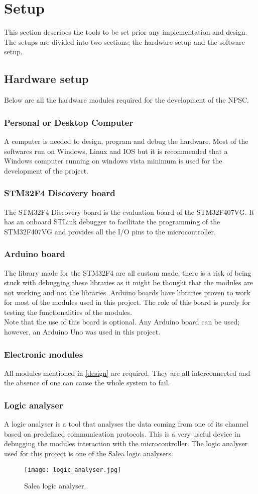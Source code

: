 \section{Setup}
This section describes the tools to be set prior any implementation and design. The setups are divided into two sections; the hardware setup and the software setup.
\subsection{Hardware setup}
Below are all the hardware modules required for the development of the NPSC.
\subsubsection{Personal or Desktop Computer}
A computer is needed to design, program and debug the hardware. Most of the softwares run on Windows, Linux and IOS but it is recommended that a Windows computer running on windows vista minimum is used for the development of the project. 
\subsubsection{STM32F4 Discovery board}
The STM32F4 Discovery board is the evaluation board of the STM32F407VG. It has an onboard STLink debugger to facilitate the programming of the STM32F407VG and provides all the I/O pins to the microcontroller.
\subsubsection{Arduino board}
The library made for the STM32F4 are all custom made, there is a risk of being stuck with debugging these libraries as it might be thought that the modules are not working and not the libraries. Arduino boards have libraries proven to work for most of the modules used in this project. The role of this board is purely for testing the functionalities of the modules.\\
Note that the use of this board is optional. Any Arduino board can be used; however, an Arduino Uno was used in this project. 
\subsubsection{Electronic modules}
All modules mentioned in \cref{design} are required. They are all interconnected and the absence of one can cause the whole system to fail.
\subsubsection{Logic analyser}\label{logic_analyser}
A logic analyser is a tool that analyses the data coming from one of its channel based on predefined communication protocols. This is a very useful device in debugging the modules interaction with the microcontroller. The logic analyser used for this project is one of the Salea logic analysers.
\begin{figure}[ht]
\centering
\texttt{[image: logic\_analyser.jpg]}
\caption{Salea logic analyser.}
\label{fig:logic_analyser}
\end{figure}
